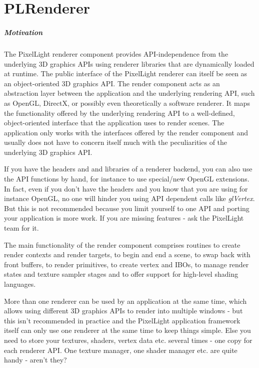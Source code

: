 \chapter{PLRenderer}


\paragraph{Motivation}
The PixelLight renderer component provides \ac{API}-independence from the underlying 3D graphics \ac{API}s using renderer libraries that are dynamically loaded at runtime. The public interface of the PixelLight renderer can itself be seen as an object-oriented 3D graphics \ac{API}. The render component acts as an abstraction layer between the application and the underlying rendering \ac{API}, such as OpenGL, DirectX, or possibly even theoretically a software renderer. It maps the functionality offered by the underlying rendering \ac{API} to a well-defined, object-oriented interface that the application uses to render scenes. The application only works with the interfaces offered by the render component and usually does not have to concern itself much with the peculiarities of the underlying 3D graphics \ac{API}.

If you have the headers and and libraries of a renderer backend, you can also use the \ac{API} functions by hand, for instance to use special/new OpenGL extensions. In fact, even if you don't have the headers and you know that you are using for instance OpenGL, no one will hinder you using \ac{API} dependent calls like \emph{glVertex}. But this is not recommended because you limit yourself to one \ac{API} and porting your application is more work. If you are missing features - ask the PixelLight team for it.

The main functionality of the render component comprises routines to create render contexts and render targets, to begin and end a scene, to swap back with front buffers, to render primitives, to create vertex and \ac{IBO}s, to manage render states and texture sampler stages and to offer support for high-level shading languages.

More than one renderer can be used by an application at the same time, which allows using different 3D graphics \ac{API}s to render into multiple windows - but this isn't recommended in practice and the PixelLight application framework itself can only use one renderer at the same time to keep things simple. Else you need to store your textures, shaders, vertex data etc. several times - one copy for each renderer \ac{API}. One texture manager, one shader manager etc. are quite handy - aren't they?

